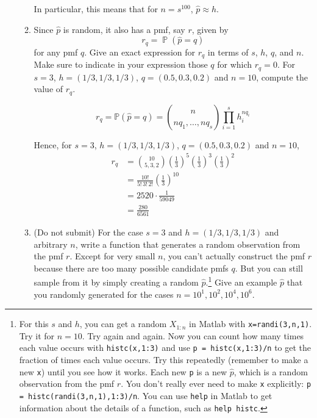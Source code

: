 \documentclass[12pt]{article}
\renewcommand{\hat}[1]{\widehat{#1}}
\renewcommand{\P}{\mathbb{P}}
\DeclareMathOperator{\Prob}{\mathbb{P}}
\begin{document}
\begin{enumerate}[1.]
\begin{enumerate}
		            In particular, this means that for $n = s^{100}$, $\hat p \approx h$.
		            \color{black}


		      \item Since $\widehat p$ is random, it also has a pmf, say $r$, given by
		            \[ r_q = \Prob(\widehat p = q) \]
		            for any pmf $q$.
		            Give an exact expression for $r_q$ in terms of $s$, $h$, $q$, and $n$. Make sure to indicate in your expression those $q$ for which $r_q=0$. For $s=3$, $h=(1/3,1/3,1/3)$, $q=(0.5,0.3,0.2)$ and $n=10$, compute the value of $r_q$.

		            \color{blue}
		            \[r_q = \P(\hat p = q) = \binom{n}{n q_1, \dots, n q_s} \prod_{i=1}^s h_i^{n q_i}\]

		            Hence, for $s=3$, $h=(1/3,1/3,1/3)$, $q=(0.5,0.3,0.2)$ and $n=10$,
		            \begin{align*}
			            r_q & = \binom{10}{5, 3, 2} \left(\frac{1}{3}\right)^5 \left(\frac{1}{3}\right)^3 \left(\frac{1}{3}\right)^2 \\
			                & =  \frac{10!}{5!\, 3!\, 2!} \left(\frac{1}{3}\right)^{10}                                              \\
			                & = 2520 \cdot \frac{1}{59049}                                                                           \\
			                & = \boxed{\frac{280}{6561}}
		            \end{align*}
		            \color{black}
		      \item {\color{blue} (Do not submit)} For the case $s=3$ and $h=(1/3,1/3,1/3)$ and arbitrary $n$, write a function that generates a random observation from the pmf $r$. Except for very small $n$, you can't actually construct the pmf $r$ because there are too many possible candidate pmfs $q$. But you can still sample from it by simply creating a random $\widehat p$.\footnote{For this $s$ and $h$, you can get a random $X_{1:n}$ in Matlab with {\tt x=randi(3,n,1)}. Try it for $n=10$. Try again and again. Now you can count how many times each value occurs with {\tt histc(x,1:3)} and use {\tt p = histc(x,1:3)/n} to get the fraction of times each value occurs. Try this repeatedly (remember to make a new {\tt x}) until you see how it works. Each new {\tt p} is a new $\widehat p$, which is a random observation from the pmf $r$. You don't really ever need to make {\tt x} explicitly: {\tt p = histc(randi(3,n,1),1:3)/n}. You can use {\tt help} in Matlab to get information about the details of a function, such as {\tt help histc}.} Give an example $\widehat p$ that you randomly generated for the cases $n=10^1,10^2,10^4,10^6$.


\end{enumerate}
\end{enumerate}
\end{document}
